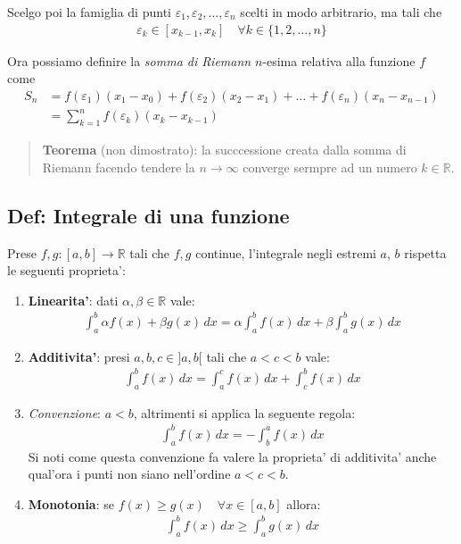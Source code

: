 \documentclass{article}
\begin{document}
Scelgo poi la famiglia di punti $\varepsilon_1, \varepsilon_2, \ldots,
\varepsilon_n$ scelti in modo arbitrario, ma tali che
\begin{align*}
  \varepsilon_k \in [x_{k-1}, x_k] \quad \forall k \in \{ 1, 2, \ldots, n \}
\end{align*}

Ora possiamo definire la \emph{somma di Riemann} $n$-esima relativa alla funzione $f$ come
\begin{align*}
  S_n &= f(\varepsilon_1) (x_1 - x_0) + f(\varepsilon_2) (x_2 - x_1) + \ldots + f(\varepsilon_n) (x_n - x_{n-1}) \\
      &= \sum_{k=1}^n f(\varepsilon_k)(x_k - x_{k-1})
\end{align*}

\begin{quote}
  \textbf{Teorema} (non dimostrato): la succcessione creata dalla somma di Riemann
  facendo tendere la $n \to \infty$ converge sermpre ad un numero $k \in \mathbb{R}$.
\end{quote}

\subsection{Def: Integrale di una funzione}

Prese $f, g : [a, b] \to \mathbb{R}$ tali che $f, g$ continue, l'integrale negli
estremi $a$, $b$ rispetta le seguenti proprieta':

\begin{enumerate}
  \item \textbf{Linearita'}: dati $\alpha, \beta \in \mathbb{R}$ vale:
    \begin{align*}
      \int_a^b \alpha f(x) + \beta g(x) \, dx = \alpha \int_a^b f(x) \, dx + \beta \int_a^b g(x) \, dx
    \end{align*}

  \item \textbf{Additivita'}: presi $a, b, c \in ] a, b [$ tali che $a < c < b$ vale:
    \begin{align*}
      \int_a^b f(x) \, dx = \int_a^c f(x) \, dx + \int_c^b f(x) \, dx
    \end{align*}

  \item \emph{Convenzione}: $a < b$, altrimenti si applica la seguente regola:
    \begin{align*}
      \int_a^b f(x) \, dx = - \int_b^a f(x) \, dx
    \end{align*}
    Si noti come questa convenzione fa valere la proprieta' di additivita' anche
    qual'ora i punti non siano nell'ordine $a < c < b$.

  \item \textbf{Monotonia}: se $f(x) \geq g(x) \quad \forall x \in [a,b]$ allora:
    \begin{align*}
      \int_a^b f(x) \, dx \geq \int_a^b g(x) \, dx
    \end{align*}
\end{enumerate}
\end{document}
